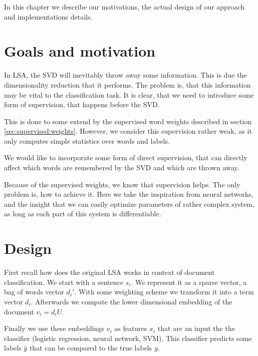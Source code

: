     In this chapter we describe our motivations, the actual design of our approach and implementations details.
    
    \section{Goals and motivation}
    
    \* %
    \* %

    In LSA, the SVD will inevitably throw away some information. 
    This is due the dimensionality reduction that it performs.
    The problem is, that this information may be vital to the classification task. 
    It is clear, that we need to introduce some form of supervision, that happens before the SVD.
    
    This is done to some extend by the supervised word weights described in section \ref{sec:supervised:weights}. 
    However, we consider this supervision rather weak, as it only computes simple statistics over words and labels.
    
    We would like to incorporate some form of direct supervision, that can directly affect which words are remembered by the SVD and which are thrown away.
    
    Because of the supervised weights, we know that supervision helps. 
    The only problem is, how to achieve it. 
    Here we take the inspiration from neural networks, and the insight that we can easily optimize parameters of rather complex system, as long as each part of this system is differentiable. 
    
    \section{Design}
    
    First recall how does the original LSA works in context of document classification.
    We start with a sentence $s_i$. We represent it as a sparse vector, a bag of words vector $d_i'$. 
    With some weighting scheme we transform it into a term vector $d_i$.
    Afterwards we compute the lower dimensional embedding of the document $v_i = d_i U$. 
    
    Finally we use these embeddings $v_i$ as features $x_i$ that are an input the the classifier (logistic regression, neural network, SVM).
    This classifier predicts some labels $\hat{y}$ that can be compared to
    the true labels $y$.
    
